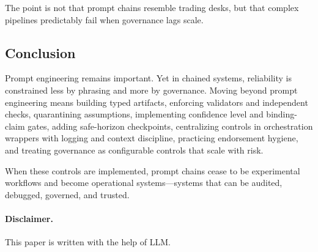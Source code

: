 The point is not that prompt chains resemble trading desks, but that complex pipelines predictably fail when governance lags scale. 

\subsection{Conclusion}
Prompt engineering remains important. Yet in chained systems, reliability is constrained less by phrasing and more by governance. Moving beyond prompt engineering means building typed artifacts, enforcing validators and independent checks, quarantining assumptions, implementing confidence level and binding-claim gates, adding safe-horizon checkpoints, centralizing controls in orchestration wrappers with logging and context discipline, practicing endorsement hygiene, and treating governance as configurable controls that scale with risk.

When these controls are implemented, prompt chains cease to be experimental workflows and become operational systems---systems that can be audited, debugged, governed, and trusted.

\paragraph{Disclaimer.}
This paper is written with the help of LLM. 